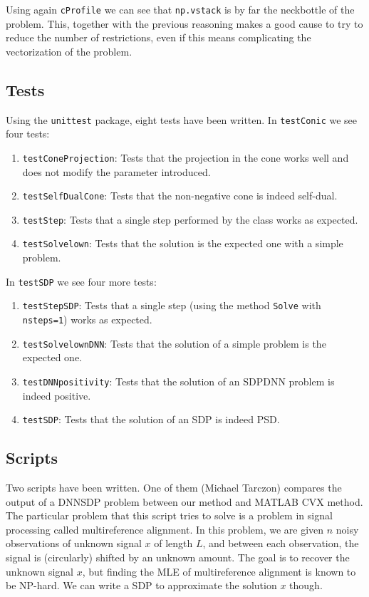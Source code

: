 \documentclass[paper=a4, fontsize=11pt]{scrartcl}
\numberwithin{equation}{section}		%
\numberwithin{figure}{section}			%
\numberwithin{table}{section}				%
\begin{document}
Using again \texttt{cProfile} we can see that \texttt{np.vstack} is by far the neckbottle of the problem. This, together with the previous reasoning makes a good cause to try to reduce the number of restrictions, even if this means complicating the vectorization of the problem.

\subsection{Tests}

Using the \texttt{unittest} package, eight tests have been written.
In \texttt{testConic} we see four tests:
\begin{enumerate}
\item \texttt{testConeProjection}: Tests that the projection in the cone works well and does not modify the parameter introduced.
\item \texttt{testSelfDualCone}: Tests that the non-negative cone is indeed self-dual.
\item \texttt{testStep}: Tests that a single step performed by the class works as expected.
\item \texttt{testSolvelown}: Tests that the solution is the expected one with a simple problem.
\end{enumerate}
In \texttt{testSDP} we see four more tests:
\begin{enumerate}
\item \texttt{testStepSDP}: Tests that a single step (using the method \texttt{Solve} with \texttt{nsteps=1}) works as expected.
\item \texttt{testSolvelownDNN}: Tests that the solution of a simple problem is the expected one.
\item \texttt{testDNNpositivity}: Tests that the solution of an SDPDNN problem is indeed positive.
\item \texttt{testSDP}: Tests that the solution of an SDP is indeed PSD.
\end{enumerate}

\subsection{Scripts}
Two scripts have been written. One of them (Michael Tarczon) compares the output of a DNNSDP problem between our method and MATLAB CVX method.  The particular problem that this script tries to solve is a problem in signal processing called multireference alignment.  In this problem, we are given $n$ noisy observations of unknown signal $x$ of length $L$, and between each observation, the signal is (circularly) shifted by an unknown amount. The goal is to recover the unknown signal $x$, but finding the MLE of multireference alignment is known to be NP-hard.  We can write a SDP to approximate the solution $x$ though.
\end{document}
